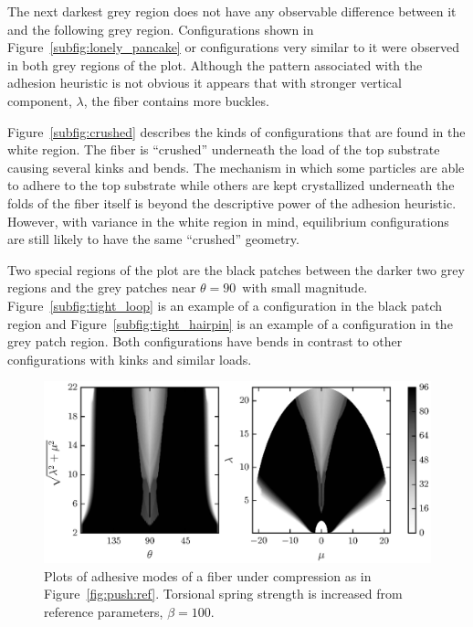 {The next darkest grey region does not have any observable difference between it and the following grey region. Configurations shown in Figure~\ref{subfig:lonely_pancake} or configurations very similar to it were observed in both grey regions of the plot. Although the pattern associated with the adhesion heuristic is not obvious it appears that with stronger vertical component, $\lambda$, the fiber contains more buckles.

Figure~\ref{subfig:crushed} describes the kinds of configurations that are found in the white region. The fiber is ``crushed'' underneath the load of the top substrate causing several kinks and bends. The mechanism in which some particles are able to adhere to the top substrate while others are kept crystallized underneath the folds of the fiber itself is beyond the descriptive power of the adhesion heuristic. However, with variance in the white region in mind, equilibrium configurations are still likely to have the same ``crushed'' geometry.

Two special regions of the plot are the black patches between the darker two grey regions and the grey patches near $\theta=90$\textdegree\ with small magnitude. Figure~\ref{subfig:tight_loop} is an example of a configuration in the black patch region and Figure~\ref{subfig:tight_hairpin} is an example of a configuration in the grey patch region. Both configurations have bends in contrast to other configurations with kinks and similar loads.

	\begin{figure}[t]
		\begin{center}
			\includegraphics{./fig/ch3/push/b100/grid.eps}
		\end{center}		
		\caption{Plots of adhesive modes of a fiber under compression as in Figure~\ref{fig:push:ref}. Torsional spring strength is increased from reference parameters, $\beta=100$.
		\label{fig:push:b100}}
	\end{figure}	
	
}
